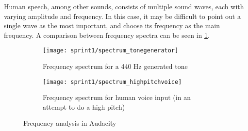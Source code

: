 Human speech, among other sounds, consists of multiple sound waves, each with varying amplitude and frequency.
In this case, it may be difficult to point out a single wave as the most important, and choose its frequency as the main frequency.
A comparison between frequency spectra can be seen in \cref{fig:frequency_spectra}.

\begin{figure}[h]
\centering
\begin{subfigure}[t]{.45\textwidth}
\texttt{[image: sprint1/spectrum\_tonegenerator]}
\caption{Frequency spectrum for a 440 Hz generated tone}
\end{subfigure}
\begin{subfigure}[t]{.45\textwidth}
\texttt{[image: sprint1/spectrum\_highpitchvoice]}
\caption{Frequency spectrum for human voice input (in an attempt to do a high pitch)}
\end{subfigure}
\caption{Frequency analysis in Audacity}
\label{fig:frequency_spectra}
\end{figure}
